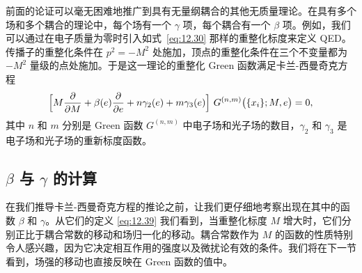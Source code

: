 前面的论证可以毫无困难地推广到具有无量纲耦合的其他无质量理论。在具有多个场和多个耦合的理论中，每个场有一个 $\gamma$ 项，每个耦合有一个 $\beta$ 项。例如，我们可以通过在电子质量为零时引入如式~\eqref{eq:12.30} 那样的重整化标度来定义 QED。传播子的重整化条件在 $p^2 = -M^2$ 处施加，顶点的重整化条件在三个不变量都为 $-M^2$ 量级的点处施加。于是这一理论的重整化 Green 函数满足卡兰-西曼奇克方程
\begin{equation}
  \Bigl[ M\frac{\partial}{\partial M} + \beta(e)\frac{\partial}{\partial e}
    + n\gamma_2(e) + m\gamma_3(e) \Bigr]\ G^{(n,m)}\bigl( \{x_i\}; M, e \bigr)
  = 0 ,
  \label{eq:12.42}
\end{equation}
其中 $n$ 和 $m$ 分别是 Green 函数 $G^{(n,m)}$ 中电子场和光子场的数目，$\gamma_2$ 和 $\gamma_3$ 是电子场和光子场的重新标度函数。

\subsection{$\beta$ 与 $\gamma$ 的计算}

在我们推导卡兰-西曼奇克方程的推论之前，让我们更仔细地考察出现在其中的函数 $\beta$ 和 $\gamma$。从它们的定义 \eqref{eq:12.39} 我们看到，当重整化标度 $M$ 增大时，它们分别正比于耦合常数的移动和场归一化的移动。耦合常数作为 $M$ 的函数的性质特别令人感兴趣，因为它决定相互作用的强度以及微扰论有效的条件。我们将在下一节看到，场强的移动也直接反映在 Green 函数的值中。

